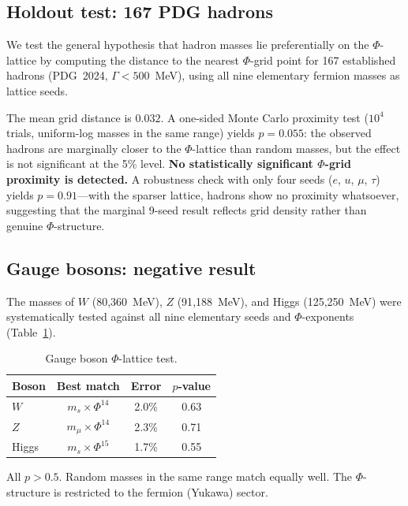 \documentclass[11pt,a4paper]{article}
\begin{document}
\subsection{Holdout test: 167 PDG hadrons}
\label{sec:holdout}

We test the general hypothesis that hadron masses lie preferentially
on the $\Phi$-lattice by computing the distance to the nearest
$\Phi$-grid point for 167 established hadrons (PDG~2024,
$\Gamma < 500$~MeV), using all nine elementary fermion masses as
lattice seeds.

The mean grid distance is $0.032$. A one-sided Monte Carlo proximity
test ($10^4$ trials, uniform-log masses in the same range) yields
$p = 0.055$: the observed hadrons are marginally closer to the
$\Phi$-lattice than random masses, but the effect is not significant
at the 5\% level. \textbf{No statistically significant $\Phi$-grid
proximity is detected.}
A robustness check with only four seeds ($e$, $u$, $\mu$, $\tau$)
yields $p = 0.91$---with the sparser lattice, hadrons show no
proximity whatsoever, suggesting that the marginal 9-seed result
reflects grid density rather than genuine $\Phi$-structure.

\subsection{Gauge bosons: negative result}
\label{sec:bosons}

The masses of $W$ (80{,}360~MeV), $Z$ (91{,}188~MeV), and Higgs
(125{,}250~MeV) were systematically tested against all nine elementary
seeds and $\Phi$-exponents (Table~\ref{tab:bosons}).

\begin{table}[H]
\centering
\caption{Gauge boson $\Phi$-lattice test.}
\label{tab:bosons}
\begin{tabular}{@{}lccc@{}}
\toprule
Boson & Best match & Error & $p$-value \\
\midrule
$W$     & $m_s \times \Phi^{14}$ & 2.0\% & 0.63 \\
$Z$     & $m_\mu \times \Phi^{14}$ & 2.3\% & 0.71 \\
Higgs   & $m_s \times \Phi^{15}$ & 1.7\% & 0.55 \\
\bottomrule
\end{tabular}
\end{table}

\noindent
All $p > 0.5$. Random masses in the same range match equally well.
The $\Phi$-structure is restricted to the fermion (Yukawa) sector.
\end{document}

